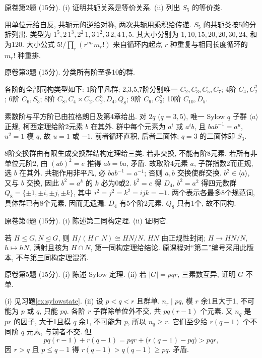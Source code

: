 \begin{exercise}原卷第2题 (15分). (i) 证明共轭关系是等价关系. (ii) 列出 $S_5$ 的等价类.\end{exercise}
\begin{solution}
用单位元给自反, 共轭元的逆给对称, 两次共轭用乘积给传递. $S_5$ 的共轭类按5的分拆列出, 类型为 $1^5,2\,1^3,2^2\,1,3\,1^2,3\,2,4\,1,5$. 其大小分别为 $1,10,15,20,20,30,24$, 和为120. 大小公式 $5!/\prod_r(r^{m_r}m_r!)$ 来自循环内起点 $r$ 种重复与相同长度循环的 $m_r!$ 种重排.
\end{solution}
\begin{exercise}\label{ex:smallgroups}原卷第3题 (15分). 分类所有阶至多10的群.\end{exercise}
\begin{solution}
各阶的全部同构类型如下: 1阶平凡群; 2,3,5,7阶分别唯一 $C_2,C_3,C_5,C_7$; 4阶 $C_4,C_2^2$; 6阶 $C_6,S_3$; 8阶 $C_8,C_4\times C_2,C_2^3,D_4,Q_8$; 9阶 $C_9,C_3^2$; 10阶 $C_{10},D_5$.

素数阶与平方阶已由拉格朗日及第4章给出. 对 $2q$ ($q=3,5$), 唯一 Sylow $q$ 子群 $\langle a\rangle$ 正规, 柯西定理给阶2元素 $b$ 在其外. 群中每个元素为 $a^i$ 或 $a^ib$, 且 $bab^{-1}=a^u$, $u^2=1$ 模 $q$, 故 $u=1$ 或 $-1$. 前者循环直积, 后者二面体; $q=3$ 的二面体即 $S_3$.

8阶交换群由有限生成交换群结构定理给三类. 若非交换, 不能有阶8元素. 若所有非单位元阶2, 由 $(ab)^2=e$ 推得 $ab=ba$, 矛盾. 故取阶4元素 $a$, 子群指数2而正规, 选 $b$ 在其外. 共轭作用非平凡, 必 $bab^{-1}=a^{-1}$; 否则 $a,b$ 交换使群交换. $b^2\in\langle a\rangle$, 又与 $b$ 交换, 因此 $b^2=a^k$ 的 $k$ 必为0或2. $b^2=e$ 得 $D_4$, $b^2=a^2$ 得四元数群 $Q_8=\{\pm1,\pm i,\pm j,\pm k\}$, 其中 $i^2=j^2=k^2=ijk=-1$. 两个表示各最多8个规范词, 具体群已有8个元素, 因而无遗漏. $D_4$ 有5个阶2元素, $Q_8$ 只有1个, 故不同构.
\end{solution}
\begin{exercise}原卷第4题 (15分). (i) 陈述第二同构定理. (ii) 证明它.\end{exercise}
\begin{solution}
若 $H\le G,N\trianglelefteq G$, 则 $H/(H\cap N)\cong HN/N$. $HN$ 由正规性封闭; $H\to HN/N$, $h\mapsto hN$, 满射且核为 $H\cap N$, 第一同构定理给结论. 原课程对“第二”编号采用此版本, 不与第三同构定理混淆.
\end{solution}
\begin{exercise}原卷第5题 (15分). (i) 陈述 Sylow 定理. (ii) 若 $|G|=pqr$, 三素数互异, 证明 $G$ 不单.\end{exercise}
\begin{solution}
(i) 见习题\ref{ex:sylowstate}. (ii) 设 $p<q<r$ 且群单. $n_r\mid pq$, 模 $r$ 余1且大于1, 不可能为 $p$ 或 $q$, 只能 $pq$. 各阶 $r$ 子群除单位外不交, 共 $pq(r-1)$ 个元素. 又 $n_q$ 是 $pr$ 的因子, 大于1且模 $q$ 余1, 不可能为 $p$, 所以 $n_q\ge r$. 它们至少给 $r(q-1)$ 个不同阶 $q$ 元素, 与前者不交. 但
\[
pq(r-1)+r(q-1)=pqr+\bigl(r(q-1)-pq\bigr)>pqr,
\]
因 $r>q$ 且 $p\le q-1$ 得 $r(q-1)>q(q-1)\ge pq$. 矛盾.
\end{solution}
